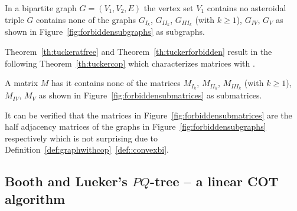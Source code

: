 \begin{theoremsansproof}
  In a bipartite graph $G = (V_1, V_2, E)$ the vertex set $V_1$
  contains no asteroidal triple \iff $G$ contains none of the graphs
  $G_{I_k}$, $G_{II_k}$, $G_{III_k}$ (with $k \ge 1$), $G_{IV}$,
  $G_{V}$ as shown in Figure~\ref{fig:forbiddensubgraphs} as subgraphs.
  \label{th:tuckerforbidden}
\end{theoremsansproof}


\figforbiddensubgraphs


Theorem~\ref{th:tuckeratfree} and Theorem~\ref{th:tuckerforbidden}
result in the following Theorem~\ref{th:tuckercop} which characterizes
matrices with \COP.

\begin{theoremsansproof}
  A matrix $M$ has \COP \iff it contains none of the matrices 
$M_{I_k}$, $M_{II_k}$, $M_{III_k}$ (with $k \ge 1$), $M_{IV}$,
  $M_{V}$ as shown in Figure~\ref{fig:forbiddensubmatrices} as submatrices.
  \label{th:tuckercop}
\end{theoremsansproof}

\figforbiddensubmatrices

It can be verified that the matrices in
Figure~\ref{fig:forbiddensubmatrices} are the half adjacency matrices
of the graphs in Figure~\ref{fig:forbiddensubgraphs} respectively
which is not surprising due to
Definition~\ref{def:graphwithcop}~\ref{def::convexbi}.

\subsection{Booth and Lueker's $PQ$-tree -- a linear COT algorithm} %


